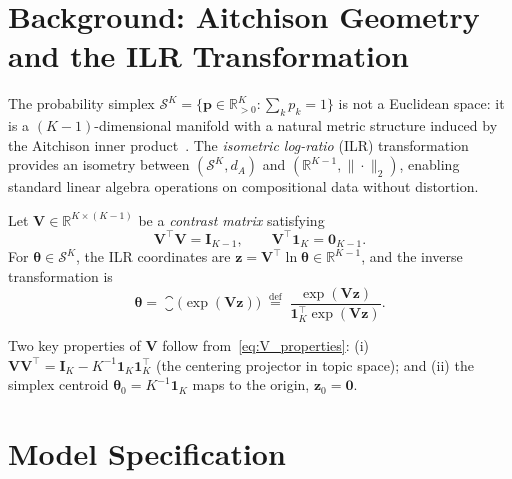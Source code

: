 \section{Background: Aitchison Geometry and the ILR Transformation}
\label{sec:background}

The probability simplex
$\mathcal{S}^K = \bigl\{\mathbf{p}\in\mathbb{R}^K_{>0}:\sum_k p_k=1\bigr\}$
is not a Euclidean space: it is a $(K{-}1)$-dimensional manifold with a
natural metric structure induced by the Aitchison inner
product~\citep{aitchison1986statistical}. The \emph{isometric log-ratio}
(ILR) transformation~\citep{egozcue2003isometric} provides an isometry
between $(\mathcal{S}^K, d_A)$ and $(\mathbb{R}^{K-1}, \|\cdot\|_2)$,
enabling standard linear algebra operations on compositional data
without distortion.

\begin{definition}
\label{def:ilr}
Let $\mathbf{V}\in\mathbb{R}^{K\times(K{-}1)}$ be a \emph{contrast
matrix} satisfying
\begin{equation}
  \mathbf{V}^{\!\top}\mathbf{V} = \mathbf{I}_{K-1},
  \qquad
  \mathbf{V}^{\!\top}\mathbf{1}_K = \mathbf{0}_{K-1}.
  \label{eq:V_properties}
\end{equation}
For $\boldsymbol{\theta}\in\mathcal{S}^K$, the ILR coordinates are
$\mathbf{z} = \mathbf{V}^{\!\top}\ln\boldsymbol{\theta}
 \in\mathbb{R}^{K-1}$,
and the inverse transformation is
\begin{equation}
  \boldsymbol{\theta}
  = \closure\!\bigl(\exp(\mathbf{V}\mathbf{z})\bigr)
  \;\stackrel{\text{def}}{=}\;
  \frac{\exp(\mathbf{V}\mathbf{z})}
       {\mathbf{1}_K^{\!\top}\exp(\mathbf{V}\mathbf{z})}.
  \label{eq:ilr_inverse}
\end{equation}
\end{definition}

\noindent
Two key properties of $\mathbf{V}$ follow
from~\eqref{eq:V_properties}: (i) $\mathbf{V}\mathbf{V}^{\!\top}
= \mathbf{I}_K - K^{-1}\mathbf{1}_K\mathbf{1}_K^{\!\top}$
(the centering projector in topic space); and (ii) the simplex centroid
$\boldsymbol{\theta}_0 = K^{-1}\mathbf{1}_K$ maps to the origin,
$\mathbf{z}_0 = \mathbf{0}$.

\section{Model Specification}
\label{sec:model}

